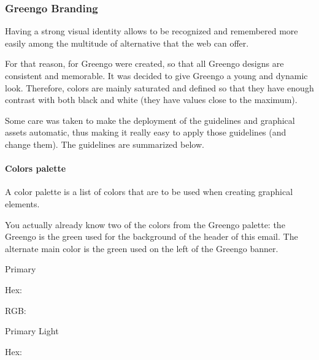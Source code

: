 \documentclass[letterpaper,10pt,english]{sphinxmanual}
\begin{document}
\subsubsection{Greengo Branding}
\label{\detokenize{blog/2020/01/branding:greengo-branding}}\label{\detokenize{blog/2020/01/branding::doc}}
\begin{figure}[htbp]
\centering

\noindent{}
\end{figure}

 Having a strong visual identity allows to be recognized and remembered more easily among the multitude of alternative that the web can offer.

For that reason,  for Greengo were created, so that all Greengo designs are consistent and memorable.
It was decided to give Greengo a young and dynamic look.
Therefore, colors are mainly saturated and defined so that they have enough contrast with both black and white (they have values close to the maximum).

Some care was taken to make the deployment of the guidelines and graphical assets automatic, thus making it really easy to apply those guidelines (and change them).
The guidelines are summarized below.


\paragraph{Colors palette}
\label{\detokenize{blog/2020/01/branding:colors-palette}}
A color palette is a list of colors that are to be used when creating graphical elements.

You actually already know two of the colors from the Greengo palette: the Greengo  is the green used for the background of the header of this email.
The alternate main color is the green used on the left of the Greengo banner.




Primary

Hex: 

RGB: 


Primary Light

Hex: 
\end{document}
